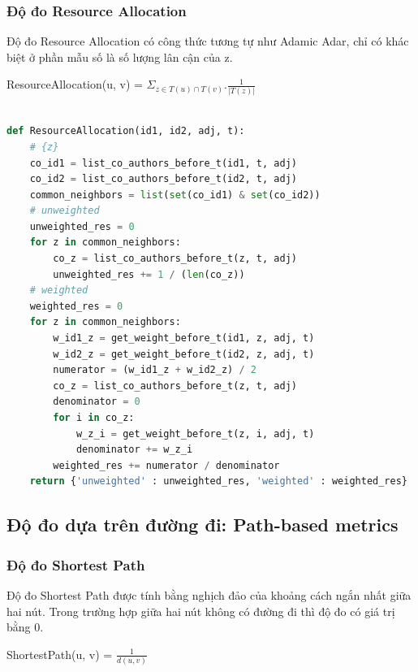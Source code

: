 \documentclass{article}
\begin{document}
\subsubsection{Độ đo Resource Allocation}

Độ đo Resource Allocation có công thức tương tự như Adamic Adar, chỉ có khác biệt ở phần mẫu số là số lượng lân cận của z.

\begin{center}
ResourceAllocation(u, v) = $\Sigma_{z \in T(u) \cap T(v)} . \frac{1}{|T(z)|}$
\end{center}

\begin{lstlisting}[language=Python, caption=Độ đo Resource Allocation]

def ResourceAllocation(id1, id2, adj, t):
    # {z}
    co_id1 = list_co_authors_before_t(id1, t, adj)
    co_id2 = list_co_authors_before_t(id2, t, adj)
    common_neighbors = list(set(co_id1) & set(co_id2))
    # unweighted
    unweighted_res = 0
    for z in common_neighbors:
        co_z = list_co_authors_before_t(z, t, adj)
        unweighted_res += 1 / (len(co_z))
    # weighted
    weighted_res = 0
    for z in common_neighbors:
        w_id1_z = get_weight_before_t(id1, z, adj, t)
        w_id2_z = get_weight_before_t(id2, z, adj, t)
        numerator = (w_id1_z + w_id2_z) / 2
        co_z = list_co_authors_before_t(z, t, adj)
        denominator = 0
        for i in co_z:
            w_z_i = get_weight_before_t(z, i, adj, t)
            denominator += w_z_i
        weighted_res += numerator / denominator
    return {'unweighted' : unweighted_res, 'weighted' : weighted_res}


\end{lstlisting}


\subsection{Độ đo dựa trên đường đi: Path-based metrics}

\subsubsection{Độ đo Shortest Path}

Độ đo Shortest Path được tính bằng nghịch đảo của khoảng cách ngắn nhất giữa hai nút. Trong trường hợp giữa hai nút không có đường đi thì độ đo có giá trị bằng 0.

\begin{center}
ShortestPath(u, v) = $\frac{1}{d(u, v)}$
\end{center}
\end{document}
